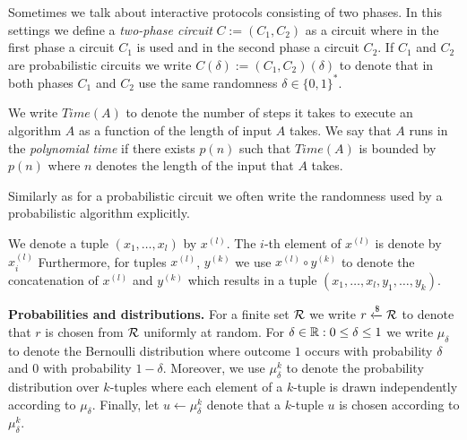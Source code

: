 Sometimes we talk about interactive protocols consisting of two phases.
In this settings we define a \textit{two-phase circuit} $C := (C_1, C_2)$ as a circuit
where in the first phase a circuit $C_1$ is used and in the second phase a circuit $C_2$.
If $C_1$ and $C_2$ are probabilistic circuits we write $C(\delta) := (C_1, C_2)(\delta)$
to denote that in both phases $C_1$ and $C_2$ use the same randomness $\delta \in \{0,1\}^{*}$.


We write $\mathit{Time}(A)$ to denote the number of steps it takes to execute
an algorithm $A$ as a function of the length of input $A$ takes.
We say that $A$ runs in the \textit{polynomial time} if there exists $p(n)$
such that $\mathit{Time}(A)$ is bounded by $p(n)$ where $n$ denotes the length of the input that $A$ takes.

Similarly as for a probabilistic circuit we often write the randomness used by a probabilistic algorithm explicitly.

We denote a tuple $(x_1, \dotsc, x_l)$ by $x^{(l)}$. The $i$-th element of $x^{(l)}$ is denote by $x^{(l)}_i$
Furthermore, for tuples $x^{(l)}$, $y^{(k)}$ we use $x^{(l)} \circ y^{(k)}$ to denote the concatenation of $x^{(l)}$ and $y^{(k)}$ which results in
a tuple $(x_1, \dotsc, x_l, y_1, \dotsc, y_k)$.


\textbf{Probabilities and distributions.}
For a finite set $\mathcal{R}$ we write $r \xleftarrow{\$} \mathcal{R}$ to denote that $r$ is chosen from $\mathcal{R}$ uniformly at random.
For $\delta \in \mathbb{R} : 0 \leq \delta \leq 1$ we write $\mu_{\delta}$ to denote the Bernoulli distribution where outcome $1$ occurs with
probability $\delta$ and $0$ with probability $1-\delta$.
Moreover, we use $\mu_{\delta}^k$ to denote the probability distribution over $k$-tuples
where each element of a $k$-tuple is drawn independently according to $\mu_{\delta}$.
Finally, let $u \leftarrow \mu_{\delta}^k$ denote that a $k$-tuple $u$ is chosen according to $\mu_{\delta}^k$.

